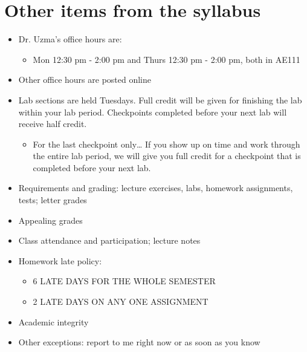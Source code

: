 \documentclass[letterpaper,10pt,english]{sphinxmanual}
\begin{document}
\section{Other items from the syllabus}
\label{\detokenize{lecture_notes/lec01_intro:other-items-from-the-syllabus}}\begin{itemize}
\item {} 
Dr. Uzma’s office hours are:
\begin{itemize}
\item {} 
Mon 12:30 pm - 2:00 pm and Thurs 12:30 pm - 2:00 pm, both in AE111

\end{itemize}

\item {} 
Other office hours are posted online

\item {} 
Lab sections are held Tuesdays. Full credit will be given for
finishing the lab within your lab period. Checkpoints completed before your
next lab will receive half credit.
\begin{itemize}
\item {} 
 For the last checkpoint only… If you show up on time and work through the entire lab period, we will give you full credit for a  checkpoint that is completed before your next lab.

\end{itemize}

\item {} 
Requirements and grading: lecture exercises, labs, homework assignments, tests; letter grades

\item {} 
Appealing grades

\item {} 
Class attendance and participation; lecture notes

\item {} 
Homework late policy:
\begin{itemize}
\item {} 
6 LATE DAYS FOR THE WHOLE SEMESTER

\item {} 
2 LATE DAYS ON ANY ONE ASSIGNMENT

\end{itemize}

\item {} 
Academic integrity

\item {} 
Other exceptions: report to me right now or as soon as you know


\end{itemize}
\end{document}
